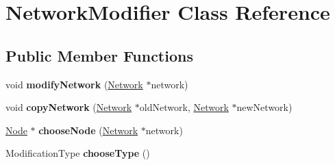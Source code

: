\hypertarget{classNetworkModifier}{}\section{Network\+Modifier Class Reference}
\label{classNetworkModifier}
\subsection*{Public Member Functions}
\begin{DoxyCompactItemize}
\item 
void {\bfseries modify\+Network} (\hyperlink{classNetwork}{Network} $\ast$network)\hypertarget{classNetworkModifier_a7d5af0b6aaa1a8365ff03749a7eb0376}{}\label{classNetworkModifier_a7d5af0b6aaa1a8365ff03749a7eb0376}

\item 
void {\bfseries copy\+Network} (\hyperlink{classNetwork}{Network} $\ast$old\+Network, \hyperlink{classNetwork}{Network} $\ast$new\+Network)\hypertarget{classNetworkModifier_a2ab956789ff4a954e0e3dd027512012b}{}\label{classNetworkModifier_a2ab956789ff4a954e0e3dd027512012b}

\item 
\hyperlink{classNode}{Node} $\ast$ {\bfseries choose\+Node} (\hyperlink{classNetwork}{Network} $\ast$network)\hypertarget{classNetworkModifier_a236ee2c417412e6333d4ed855bd9f88f}{}\label{classNetworkModifier_a236ee2c417412e6333d4ed855bd9f88f}

\item 
Modification\+Type {\bfseries choose\+Type} ()\hypertarget{classNetworkModifier_a11a4d6c3bb19cda4e9714ad296d72db1}{}\label{classNetworkModifier_a11a4d6c3bb19cda4e9714ad296d72db1}


\end{DoxyCompactItemize}
